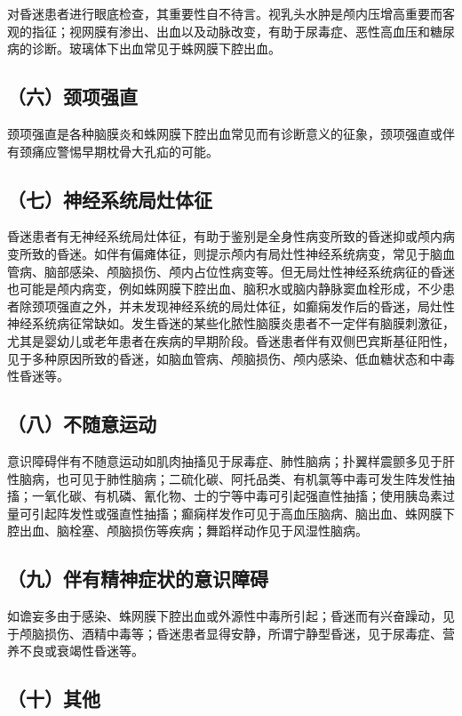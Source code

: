 对昏迷患者进行眼底检查，其重要性自不待言。视乳头水肿是颅内压增高重要而客观的指征；视网膜有渗出、出血以及动脉改变，有助于尿毒症、恶性高血压和糖尿病的诊断。玻璃体下出血常见于蛛网膜下腔出血。

\subsection{（六）颈项强直}

颈项强直是各种脑膜炎和蛛网膜下腔出血常见而有诊断意义的征象，颈项强直或伴有颈痛应警惕早期枕骨大孔疝的可能。

\subsection{（七）神经系统局灶体征}

昏迷患者有无神经系统局灶体征，有助于鉴别是全身性病变所致的昏迷抑或颅内病变所致的昏迷。如伴有偏瘫体征，则提示颅内有局灶性神经系统病变，常见于脑血管病、脑部感染、颅脑损伤、颅内占位性病变等。但无局灶性神经系统病征的昏迷也可能是颅内病变，例如蛛网膜下腔出血、脑积水或脑内静脉窦血栓形成，不少患者除颈项强直之外，并未发现神经系统的局灶体征，如癫痫发作后的昏迷，局灶性神经系统病征常缺如。发生昏迷的某些化脓性脑膜炎患者不一定伴有脑膜刺激征，尤其是婴幼儿或老年患者在疾病的早期阶段。昏迷患者伴有双侧巴宾斯基征阳性，见于多种原因所致的昏迷，如脑血管病、颅脑损伤、颅内感染、低血糖状态和中毒性昏迷等。

\subsection{（八）不随意运动}

意识障碍伴有不随意运动如肌肉抽搐见于尿毒症、肺性脑病；扑翼样震颤多见于肝性脑病，也可见于肺性脑病；二硫化碳、阿托品类、有机氯等中毒可发生阵发性抽搐；一氧化碳、有机磷、氰化物、士的宁等中毒可引起强直性抽搐；使用胰岛素过量可引起阵发性或强直性抽搐；癫痫样发作可见于高血压脑病、脑出血、蛛网膜下腔出血、脑栓塞、颅脑损伤等疾病；舞蹈样动作见于风湿性脑病。

\subsection{（九）伴有精神症状的意识障碍}

如谵妄多由于感染、蛛网膜下腔出血或外源性中毒所引起；昏迷而有兴奋躁动，见于颅脑损伤、酒精中毒等；昏迷患者显得安静，所谓宁静型昏迷，见于尿毒症、营养不良或衰竭性昏迷等。

\subsection{（十）其他}

